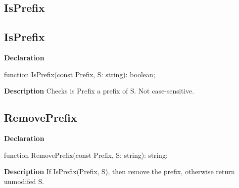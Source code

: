 \documentclass{report}
\newif\ifpdf
\begin{document}
\subsection*{\large{\textbf{IsPrefix}}\normalsize\hspace{1ex}\hrulefill}
\else
\subsection*{IsPrefix}
\fi
\label{PasDoc_Utils-IsPrefix}
\begin{list}{}{
\setlength{\itemindent}{0cm}
\setlength{\listparindent}{0cm}
\setlength{\leftmargin}{\evensidemargin}
\addtolength{\leftmargin}{\tmplength}
\settowidth{\labelsep}{X}
\addtolength{\leftmargin}{\labelsep}
\setlength{\labelwidth}{\tmplength}
}
\item[\textbf{Declaration}\hfill]
\ifpdf
\begin{flushleft}
\fi
\begin{ttfamily}
function IsPrefix(const Prefix, S: string): boolean;\end{ttfamily}

\ifpdf
\end{flushleft}
\fi

\par
\item[\textbf{Description}]
Checks is Prefix a prefix of S. Not case{-}sensitive.

\end{list}
\ifpdf
\subsection*{\large{\textbf{RemovePrefix}}\normalsize\hspace{1ex}\hrulefill}
\else
\subsection*{RemovePrefix}
\fi
\label{PasDoc_Utils-RemovePrefix}
\begin{list}{}{
\setlength{\itemindent}{0cm}
\setlength{\listparindent}{0cm}
\setlength{\leftmargin}{\evensidemargin}
\addtolength{\leftmargin}{\tmplength}
\settowidth{\labelsep}{X}
\addtolength{\leftmargin}{\labelsep}
\setlength{\labelwidth}{\tmplength}
}
\item[\textbf{Declaration}\hfill]
\ifpdf
\begin{flushleft}
\fi
\begin{ttfamily}
function RemovePrefix(const Prefix, S: string): string;\end{ttfamily}

\ifpdf
\end{flushleft}
\fi

\par
\item[\textbf{Description}]
If IsPrefix(Prefix, S), then remove the prefix, otherwise return unmodifed S.

\end{list}
\ifpdf
\end{document}
